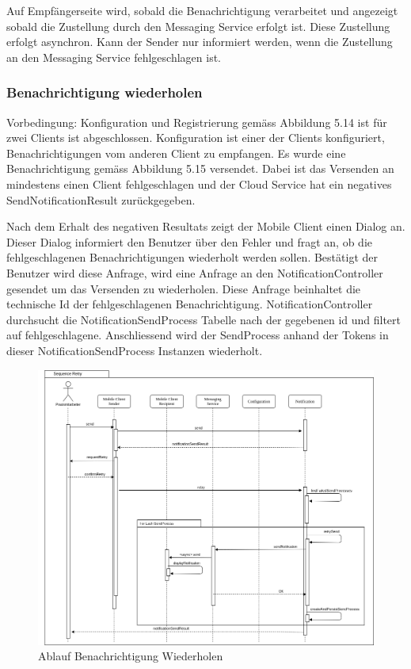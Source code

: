 Auf Empfängerseite wird, sobald die Benachrichtigung verarbeitet und angezeigt sobald die Zustellung durch den Messaging Service erfolgt ist.
Diese Zustellung erfolgt asynchron.
Kann der Sender nur informiert werden, wenn die Zustellung an den Messaging Service fehlgeschlagen ist.

\clearpage
\subsubsection*{Benachrichtigung wiederholen}

Vorbedingung:
Konfiguration und Registrierung gemäss Abbildung 5.14 ist für zwei Clients ist abgeschlossen.
Konfiguration ist einer der Clients konfiguriert, Benachrichtigungen vom anderen Client zu empfangen.
Es wurde eine Benachrichtigung gemäss Abbildung 5.15 versendet.
Dabei ist das Versenden an mindestens einen Client fehlgeschlagen und der Cloud Service hat ein negatives SendNotificationResult zurückgegeben.

Nach dem Erhalt des negativen Resultats zeigt der Mobile Client einen Dialog an.
Dieser Dialog informiert den Benutzer über den Fehler und fragt an, ob die fehlgeschlagenen Benachrichtigungen wiederholt werden sollen.
Bestätigt der Benutzer wird diese Anfrage, wird eine Anfrage an den NotificationController gesendet um das Versenden zu wiederholen.
Diese Anfrage beinhaltet die technische Id der fehlgeschlagenen Benachrichtigung.
NotificationController durchsucht die NotificationSendProcess Tabelle nach der gegebenen id und filtert auf fehlgeschlagene.
Anschliessend wird der SendProcess anhand der Tokens in dieser NotificationSendProcess Instanzen wiederholt.

\begin{figure}[h]
    \centering
    \begin{minipage}[b]{0.9\textwidth}
        \includegraphics[width=\textwidth]{graphics/Sequence_Notification_Retry}
        \caption{Ablauf Benachrichtigung Wiederholen}
    \end{minipage}
\end{figure}


